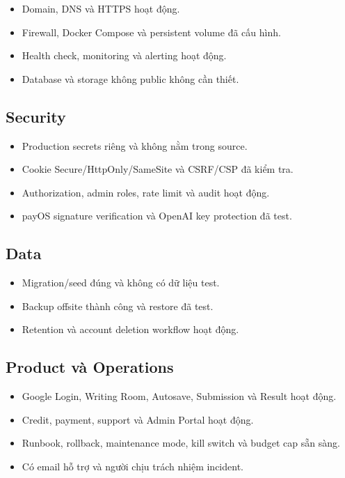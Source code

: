 \documentclass[11pt,a4paper]{article}
\begin{document}
\begin{itemize}
  \item[$\square$] Domain, DNS và HTTPS hoạt động.
  \item[$\square$] Firewall, Docker Compose và persistent volume đã cấu hình.
  \item[$\square$] Health check, monitoring và alerting hoạt động.
  \item[$\square$] Database và storage không public không cần thiết.
\end{itemize}

\subsection{Security}

\begin{itemize}
  \item[$\square$] Production secrets riêng và không nằm trong source.
  \item[$\square$] Cookie Secure/HttpOnly/SameSite và CSRF/CSP đã kiểm tra.
  \item[$\square$] Authorization, admin roles, rate limit và audit hoạt động.
  \item[$\square$] payOS signature verification và OpenAI key protection đã test.
\end{itemize}

\subsection{Data}

\begin{itemize}
  \item[$\square$] Migration/seed đúng và không có dữ liệu test.
  \item[$\square$] Backup offsite thành công và restore đã test.
  \item[$\square$] Retention và account deletion workflow hoạt động.
\end{itemize}

\subsection{Product và Operations}

\begin{itemize}
  \item[$\square$] Google Login, Writing Room, Autosave, Submission và Result hoạt động.
  \item[$\square$] Credit, payment, support và Admin Portal hoạt động.
  \item[$\square$] Runbook, rollback, maintenance mode, kill switch và budget cap sẵn sàng.
  \item[$\square$] Có email hỗ trợ và người chịu trách nhiệm incident.
\end{itemize}
\end{document}
